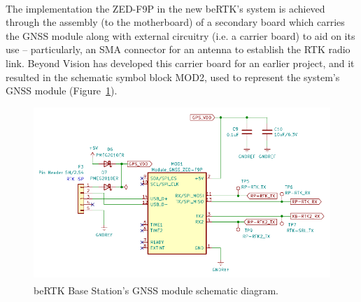 The implementation the ZED-F9P in the new beRTK\textsuperscript{\textregistered}'s system is achieved through the assembly (to the motherboard) of a secondary board which carries the GNSS module along with external circuitry (i.e. a carrier board) to aid on its use -- particularly, an SMA connector for an antenna to establish the RTK radio link. Beyond Vision has developed this carrier board for an earlier project, and it resulted in the schematic symbol block MOD2, used to represent the system's GNSS module (Figure~\ref{fig:ZEDF9P_circuit}).

\begin{figure}[h]
	\centering
	\includegraphics[width=1.0\textwidth]{Chapters/Figures/chapter3/Modules_ZEDF9P.pdf}
	\caption{beRTK\textsuperscript{\textregistered} Base Station's GNSS module schematic diagram.}
	\label{fig:ZEDF9P_circuit}
\end{figure}

